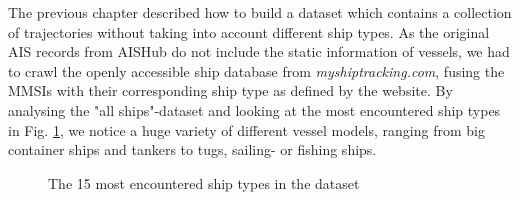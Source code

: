 The previous chapter described how to build a dataset which contains a collection of trajectories without taking into account different ship types. As the original AIS records from AISHub do not include the static information of vessels, we had to crawl the openly accessible ship database from \textit{myshiptracking.com}, fusing the MMSIs with their corresponding ship type as defined by the website. By analysing the "all ships"-dataset and looking at the most encountered ship types in Fig. \ref{fig:shipTypes}, we notice a huge variety of different vessel models, ranging from big container ships and tankers to tugs, sailing- or fishing ships.
\begin{figure}[H]
    \centering
    
    \caption{The 15 most encountered ship types in the dataset}
    \label{fig:shipTypes}
\end{figure}

